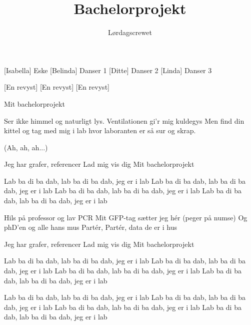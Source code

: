 \documentclass[a4paper,11pt]{article}
\title{Bachelorprojekt}
\author{Lørdagscrewet}
\begin{document}
\maketitle

\begin{roles}
  [Isabella] Eske
  [Belinda] Danser 1
  [Ditte] Danser 2
  [Linda] Danser 3
\end{roles}

\begin{props}
    [En revyst]
    [En revyst]
    [En revyst]
\end{props}

\begin{center}
\end{center}

\begin{song}
   Mit bachelorprojekt


Ser ikke himmel og naturligt lys.
Ventilationen gi’r mig kuldegys
Men find din kittel og tag med mig i lab
hvor laboranten er så sur og skrap.

(Ah, ah, ah...)

Jeg har grafer,
referencer
Lad mig vis dig
Mit bachelorprojekt

Lab ba di ba dab, lab ba di ba dab, jeg er i lab
Lab ba di ba dab, lab ba di ba dab, jeg er i lab
Lab ba di ba dab, lab ba di ba dab, jeg er i lab
Lab ba di ba dab, lab ba di ba dab, jeg er i lab

Hils på professor og lav PCR
Mit GFP-tag sætter jeg hér (peger på numse)
Og phD’en og alle hans mus
Partér, Partér, data de er i hus

Jeg har grafer,
referencer
Lad mig vis dig
Mit bachelorprojekt

Lab ba di ba dab, lab ba di ba dab, jeg er i lab
Lab ba di ba dab, lab ba di ba dab, jeg er i lab
Lab ba di ba dab, lab ba di ba dab, jeg er i lab
Lab ba di ba dab, lab ba di ba dab, jeg er i lab


Lab ba di ba dab, lab ba di ba dab, jeg er i lab
Lab ba di ba dab, lab ba di ba dab, jeg er i lab
Lab ba di ba dab, lab ba di ba dab, jeg er i lab
Lab ba di ba dab, lab ba di ba dab, jeg er i lab
\end{song}
\end{document}
